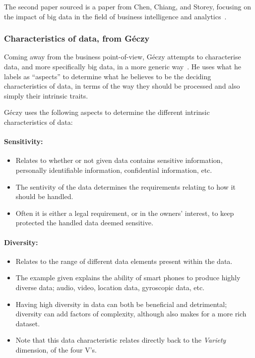 \documentclass[a4paper,11pt]{article}
\begin{document}
The second paper sourced is a paper from Chen, Chiang, and Storey, focusing on the impact of big data in the field of
business intelligence and analytics~\cite{chen2012business}.



\subsubsection{Characteristics of data, from G\'eczy} %
\label{ssub:characteristics_of_data_from_ge_czy}

Coming away from the business point-of-view, G\'eczy attempts to characterise data, and more specifically big data,  in
a more generic way~\cite{geczy_big_2014}. He uses what he labels as ``aspects'' to determine what he believes to be the
deciding characteristics of data, in terms of the way they should be processed and also simply their intrinsic traits.

G\'eczy uses the following aspects to determine the different intrinsic characteristics of data:

\paragraph{Sensitivity:}

\begin{itemize}
  \item Relates to whether or not given data contains sensitive information, \ie{}personally identifiable information,
  confidential information, etc.
  \item The sentivity of the data determines the requirements relating to how it should be handled.
  \item Often it is either a legal requirement, or in the owners' interest, to keep protected the handled data deemed sensitive.
\end{itemize}


\paragraph{Diversity:}

\begin{itemize}
  \item Relates to the range of different data elements present within the data.
  \item The example given explains the ability of smart phones to produce highly diverse data; \eg{}audio, video, location
  data, gyroscopic data, etc.
  \item Having high diversity in data can both be beneficial and detrimental; diversity can add factors of complexity,
  although also makes for a more rich dataset.
  \item Note that this data characteristic relates directly back to the \emph{Variety} dimension, of the four V's.
\end{itemize}
\end{document}
